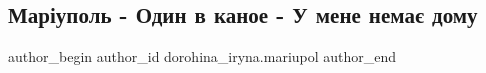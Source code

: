  
 
 
 
 

\subsection{ Маріуполь - Один в каное - У мене немає дому}
\label{sec:26_04_2022.fb.dorohina_iryna.mariupol.1._mar_upol___odin_v_k}

\ifcmt
 author_begin
   author_id dorohina_iryna.mariupol
 author_end
\fi
